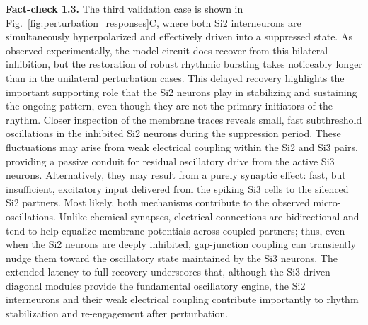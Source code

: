 \documentclass[nofootinbib,aip,amsmath,amssymb,reprint,twocolumn,10pt]{revtex4-2}
\begin{document}
{\bf Fact-check 1.3.} The third validation case is shown in Fig.~\ref{fig:perturbation_responses}C, where both Si2 interneurons are simultaneously hyperpolarized and effectively driven into a suppressed state. As observed experimentally, the model circuit does recover from this bilateral inhibition, but the restoration of robust rhythmic bursting takes noticeably longer than in the unilateral perturbation cases. This delayed recovery highlights the important supporting role that the Si2 neurons play in stabilizing and sustaining the ongoing pattern, even though they are not the primary initiators of the rhythm.
Closer inspection of the membrane traces reveals small, fast subthreshold oscillations in the inhibited Si2 neurons during the suppression period. These fluctuations may arise from weak electrical coupling within the Si2 and Si3 pairs, providing a passive conduit for residual oscillatory drive from the active Si3 neurons. Alternatively, they may result from a purely synaptic effect: fast, but insufficient, excitatory input delivered from the spiking Si3 cells to the silenced Si2 partners. Most likely, both mechanisms contribute to the observed micro-oscillations. Unlike chemical synapses, electrical connections are bidirectional and tend to help equalize membrane potentials across coupled partners; thus, even when the Si2 neurons are deeply inhibited, gap-junction coupling can transiently nudge them toward the oscillatory state maintained by the Si3 neurons. The extended latency to full recovery underscores that, although the Si3-driven diagonal modules provide the fundamental oscillatory engine, the Si2 interneurons and their weak electrical coupling contribute importantly to rhythm stabilization and re-engagement after perturbation.
\end{document}
